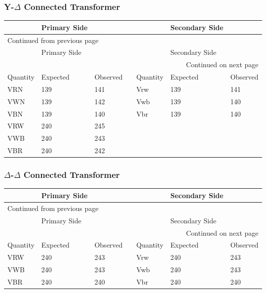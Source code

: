 \documentclass[11pt]{article}
\begin{document}
\subsubsection{Y-\(\Delta\) Connected Transformer}
\label{sec:org04f6dc2}
\begin{longtable}{|l|l|l|l|l|l|l|}
\hline
 & Primary Side &  &  &  & Secondary Side & \\
\hline
\endfirsthead
\multicolumn{7}{l}{Continued from previous page} \\
\hline

 & Primary Side &  &  &  & Secondary Side &  \\

\hline
\endhead
\hline\multicolumn{7}{r}{Continued on next page} \\
\endfoot
\endlastfoot
\hline
Quantity & Expected & Observed &  & Quantity & Expected & Observed\\
\hline
VRN & 139 & 141 &  & Vrw & 139 & 141\\
\hline
VWN & 139 & 142 &  & Vwb & 139 & 140\\
\hline
VBN & 139 & 140 &  & Vbr & 139 & 140\\
\hline
VRW & 240 & 245 &  &  &  & \\
\hline
VWB & 240 & 243 &  &  &  & \\
\hline
VBR & 240 & 242 &  &  &  & \\
\hline
\end{longtable}
\subsubsection{\(\Delta\)-\(\Delta\) Connected Transformer}
\label{sec:org8115f67}
\begin{longtable}{|l|l|l|l|l|l|l|}
\hline
 & Primary Side &  &  &  & Secondary Side & \\
\hline
\endfirsthead
\multicolumn{7}{l}{Continued from previous page} \\
\hline

 & Primary Side &  &  &  & Secondary Side &  \\

\hline
\endhead
\hline\multicolumn{7}{r}{Continued on next page} \\
\endfoot
\endlastfoot
\hline
Quantity & Expected & Observed &  & Quantity & Expected & Observed\\
\hline
VRW & 240 & 243 &  & Vrw & 240 & 243\\
\hline
VWB & 240 & 243 &  & Vwb & 240 & 243\\
\hline
VBR & 240 & 240 &  & Vbr & 240 & 240\\
\hline
\end{longtable}
\end{document}
